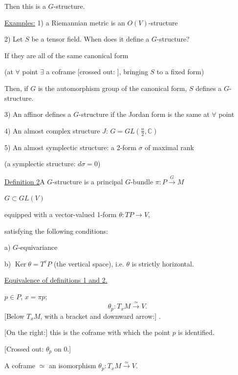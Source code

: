 Then this is a $G$-structure.

\underline{Examples:} 1) a Riemannian metric is an $O(V)$-structure

2) Let $S$ be a tensor field. When does it define a $G$-structure?

If they are all of the same canonical form

(at $\forall$ point $\exists$ a coframe
[crossed out: ], bringing $S$ to a fixed form)

Then, if $G$ is the automorphism group of the canonical form, $S$ defines a $G$-structure.

3) An affinor defines a $G$-structure if the Jordan form is the same at $\forall$ point

4) An almost complex structure $J$: $G=GL\left(\frac{n}{2},\mathbb{C}\right)$

5) An almost symplectic structure: a 2-form $\sigma$ of maximal rank

(a symplectic structure: $d\sigma=0$)

\underline{Definition 2}\quad A $G$-structure is a principal $G$-bundle
$\pi\colon P\overset{G}{\longrightarrow}M$

$G\subset GL(V)$

equipped with a vector-valued 1-form $\theta\colon TP\to V$,

satisfying the following conditions:

a) $G$-equivariance

b) $\operatorname{Ker}\theta=T^vP$ (the vertical space), i.e. $\theta$ is strictly horizontal.

\underline{Equivalence of definitions 1 and 2.}

$p\in P$, $x=\pi p$;
\begin{equation*}
\theta_p\colon T_xM\overset{\simeq}{\longrightarrow}V.
\end{equation*}
[Below $T_xM$, with a bracket and downward arrow:]
.

[On the right:] this is the coframe with which the point $p$ is identified.

[Crossed out: $\theta_p$ on  $0$.]

A coframe $\simeq$ an isomorphism $\theta_p\colon T_xM\overset{\simeq}{\longrightarrow}V$.

